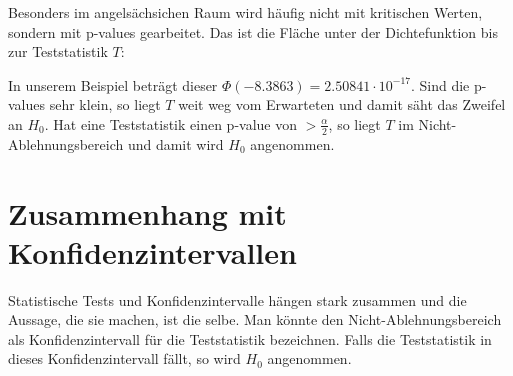 \documentclass{article}
\begin{document}
	Besonders im angelsächsichen Raum wird häufig nicht mit kritischen Werten, sondern mit p-values gearbeitet. Das ist die Fläche unter der Dichtefunktion bis zur Teststatistik $T$:
	\begin{center}
	\end{center}
	In unserem Beispiel beträgt dieser $\Phi(-8.3863) = 2.50841\cdot 10^{-17}$. Sind die p-values sehr klein, so liegt $T$ weit weg vom Erwarteten und damit säht das Zweifel an $H_0$. Hat eine Teststatistik einen p-value von $>\frac{\alpha}{2}$, so liegt $T$ im Nicht-Ablehnungsbereich und damit wird $H_0$ angenommen.
	
	\section*{Zusammenhang mit Konfidenzintervallen}
	
	Statistische Tests und Konfidenzintervalle hängen stark zusammen und die Aussage, die sie machen, ist die selbe. Man könnte den Nicht-Ablehnungsbereich als Konfidenzintervall für die Teststatistik bezeichnen. Falls die Teststatistik in dieses Konfidenzintervall fällt, so wird $H_0$ angenommen.
	
\end{document}
